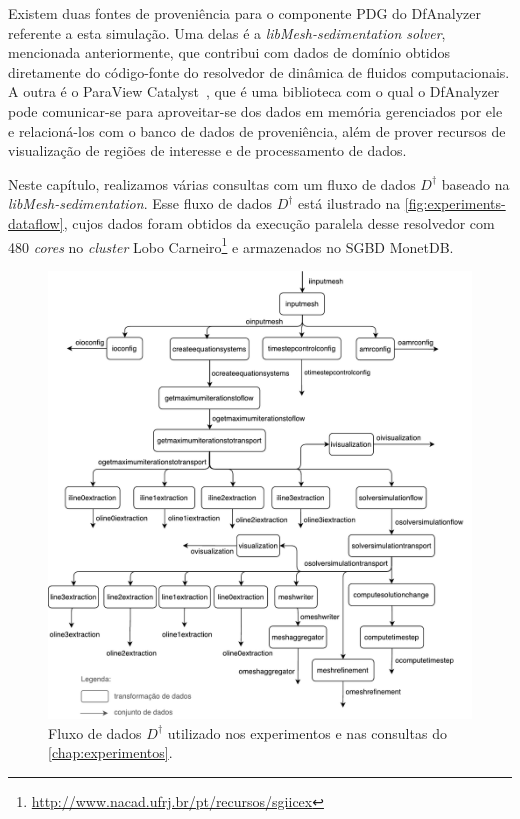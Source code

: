 Existem duas fontes de proveniência para o componente PDG do DfAnalyzer referente a esta simulação. Uma delas é a \textit{libMesh-sedimentation solver}, mencionada anteriormente, que contribui com dados de domínio obtidos diretamente do código-fonte do resolvedor de dinâmica de fluidos computacionais. A outra é o ParaView Catalyst~\cite{ayachit2015paraview}, que é uma biblioteca com o qual o DfAnalyzer pode comunicar-se para aproveitar-se dos dados em memória gerenciados por ele e relacioná-los com o banco de dados de proveniência, além de prover recursos de visualização de regiões de interesse e de processamento de dados.

Neste capítulo, realizamos várias consultas com um fluxo de dados \(D^{\dagger}\) baseado na \emph{libMesh-sedimentation}. Esse fluxo de dados \(D^{\dagger}\) está ilustrado na \autoref{fig:experiments-dataflow}, cujos dados foram obtidos da execução paralela desse resolvedor com 480 \textit{cores} no \textit{cluster} Lobo Carneiro\footnote{\url{http://www.nacad.ufrj.br/pt/recursos/sgiicex}} e armazenados no SGBD MonetDB.

\begin{figure}[!htb]
    \centering
    \includegraphics[width=\textwidth]{img/experiments-dataflow}
    \caption[Fluxo de dados $D^{\dagger}$ utilizado nos experimentos]{Fluxo de dados $D^{\dagger}$ utilizado nos experimentos e nas consultas do \autoref{chap:experimentos}.}%
    \label{fig:experiments-dataflow}
\end{figure}

